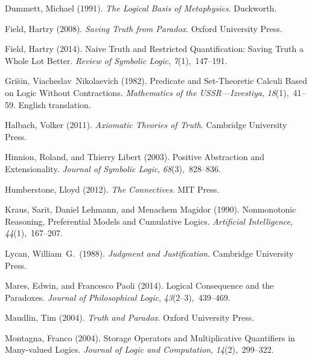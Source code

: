 \documentclass{ergoclass}
\begin{document}
\begin{thebibliography}{54}
Dummett, Michael (1991).
\newblock \emph{The Logical Basis of Metaphysics}.
\newblock Duckworth.

Field, Hartry (2008).
\newblock \emph{Saving Truth from Paradox}.
\newblock Oxford University Press.

Field, Hartry (2014).
\newblock Naive Truth and Restricted Quantification: Saving Truth a Whole Lot
  Better.
\newblock \emph{Review of Symbolic Logic}, \emph{7}(1),~147--191.

Gri{\u{s}}in, Viacheslav~Nikolaevich (1982).
\newblock Predicate and Set-Theoretic Calculi Based on Logic Without
  Contractions.
\newblock \emph{Mathematics of the USSR---Izvestiya}, \emph{18}(1),~41--59.
\newblock English translation.

Halbach, Volker (2011).
\newblock \emph{Axiomatic Theories of Truth}.
\newblock Cambridge University Press.

Hinnion, Roland, and Thierry Libert (2003).
\newblock Positive Abstraction and Extensionality.
\newblock \emph{Journal of Symbolic Logic}, \emph{68}(3),~828--836.

Humberstone, Lloyd (2012).
\newblock \emph{The Connectives}.
\newblock MIT Press.

Kraus, Sarit, Daniel Lehmann, and Menachem Magidor (1990).
\newblock Nonmonotonic Reasoning, Preferential Models and Cumulative Logics.
\newblock \emph{Artificial Intelligence}, \emph{44}(1),~167--207.

Lycan, William~G.\ (1988).
\newblock \emph{Judgment and Justification}.
\newblock Cambridge University Press.

Mares, Edwin, and Francesco Paoli (2014).
\newblock Logical Consequence and the Paradoxes.
\newblock \emph{Journal of Philosophical Logic}, \emph{43}(2--3),~439--469.

Maudlin, Tim (2004).
\newblock \emph{Truth and Paradox}.
\newblock Oxford University Press.

Montagna, Franco (2004).
\newblock Storage Operators and Multiplicative Quantifiers in Many-valued
  Logics.
\newblock \emph{Journal of Logic and Computation}, \emph{14}(2),~299--322.


\end{thebibliography}
\end{document}
